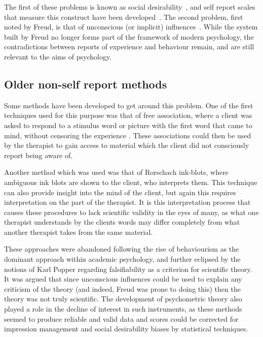 The first of these problems is known as social desirability~\cite{Egloff2003}, and  self report scales that measure this construct have been developed~\cite{Giebel2008}. The second problem, first noted by Freud, is that of unconscious (or implicit) influences~\cite{Hofmann2008}. While the system built by Freud no longer forms part of the framework of modern psychology, the contradictions between reports of experience and behaviour remain, and are still relevant to the aims of psychology. %



\subsection{Older non-self report methods}
\label{sec:older-non-self}

Some methods have been developed to get around this problem. One of the first techniques used for this purpose was that of free association, where a client was asked to respond to a stimulus word or picture with the first word that came to mind, without censoring the experience \cite{Hofmann2008}. These associations could then be used by the therapist to gain access to material which the client did not consciously report being aware of. 

Another method which was used was that of Rorschach ink-blots, where ambiguous ink blots are shown to the client, who interprets them. This technique can also provide insight into the mind of the client, but again this requires interpretation on the part of the therapist. It is this interpretation process that causes these procedures to lack scientific validity in the eyes of many, as what one therapist understands by the clients words may differ completely from what another therapist takes from the same material. 

These approaches were abandoned following the rise of behaviourism as the dominant approach within academic psychology, and further eclipsed by the notions of Karl Popper regarding falsifiability as a criterion for scientific theory. It was argued that since unconscious influences could be used to explain any criticism of the theory (and indeed, Freud was prone to doing this) then the theory was not truly scientific. The development of psychometric theory also played a role in the decline of interest in such instruments, as these methods seemed to produce reliable and valid data and scores could be corrected for impression management and social desirability biases by statistical techniques. 

